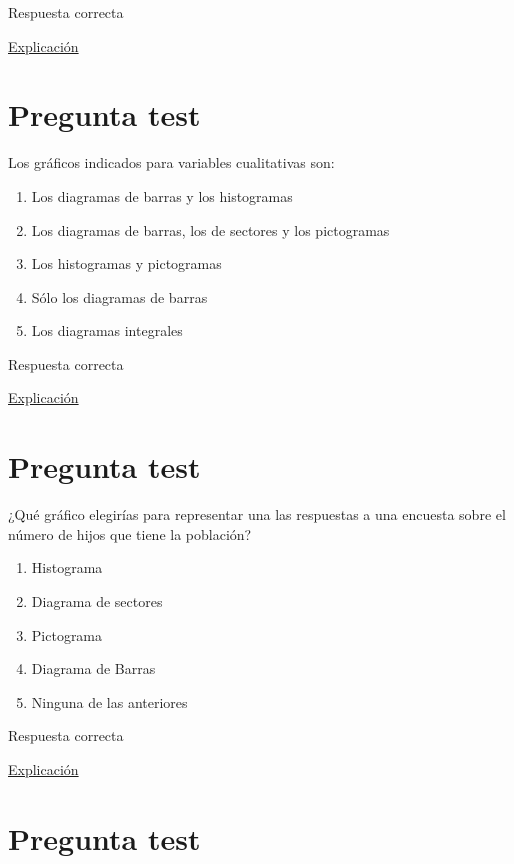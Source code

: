 \documentclass[
]{book}
\providecommand{\tightlist}{%
  \setlength{\itemsep}{0pt}\setlength{\parskip}{0pt}}
\begin{document}
Respuesta correcta

\href{https://1fjmanzano.github.io/bioestadistica/histogramas.html}{Explicación}

\hypertarget{pregunta-test-31}{%
\section{Pregunta test}\label{pregunta-test-31}}

Los gráficos indicados para variables cualitativas son:

\begin{enumerate}
\def\labelenumi{\alph{enumi})}
\tightlist
\item
  Los diagramas de barras y los histogramas
\item
  Los diagramas de barras, los de sectores y los pictogramas
\item
  Los histogramas y pictogramas
\item
  Sólo los diagramas de barras
\item
  Los diagramas integrales
\end{enumerate}

Respuesta correcta

\href{https://1fjmanzano.github.io/bioestadistica/diagramas-de-barras-y-sectores.html}{Explicación}

\hypertarget{pregunta-test-32}{%
\section{Pregunta test}\label{pregunta-test-32}}

¿Qué gráfico elegirías para representar una las respuestas a una encuesta sobre el número de hijos que tiene la población?

\begin{enumerate}
\def\labelenumi{\alph{enumi})}
\tightlist
\item
  Histograma
\item
  Diagrama de sectores
\item
  Pictograma
\item
  Diagrama de Barras
\item
  Ninguna de las anteriores
\end{enumerate}

Respuesta correcta

\href{https://1fjmanzano.github.io/bioestadistica/diagramas-de-barras-y-sectores.html}{Explicación}

\hypertarget{pregunta-test-33}{%
\section{Pregunta test}\label{pregunta-test-33}}
\end{document}
